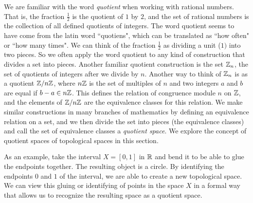\label{chap:quotients}


\vspace*{-17 pt}

\vspace*{13 pt}

\label{sec_quotients}

We are familiar with the word \emph{quotient} when working with rational numbers. That is, the fraction $\frac{1}{2}$ is the quotient of $1$ by $2$, and the set of rational numbers is the collection of all defined quotients of integers. The word quotient seems to have come from the latin word ``quotiens", which can be translated as ``how often" or ``how many times". We can think of the fraction $\frac{1}{2}$ as dividing a unit ($1)$ into two pieces. So we often apply the word quotient to any kind of construction that divides a set into pieces. Another familiar quotient construction is the set $\mathbb{Z}_n$, the set of quotients of integers after we divide by $n$. Another way to think of $\mathbb{Z}_n$ is as a quotient $\mathbb{Z}/n\mathbb{Z}$, where $n\mathbb{Z}$ is the set of multiples of $n$ and two integers $a$ and $b$ are equal if $b-a \in n\mathbb{Z}$. This defines the relation of congruence module $n$ on $\mathbb{Z}$, and the elements of $\mathbb{Z}/n\mathbb{Z}$ are the equivalence classes for this relation. We make similar constructions in many branches of mathematics by defining an equivalence relation on a set, and we then divide the set into pieces (the equivalence classes) and call the set of equivalence classes a \emph{quotient space}. We explore the concept of quotient spaces of topological spaces in this section.

As an example, take the interval $X = [0,1]$ in $\mathbb{R}$ and bend it to be able to glue the endpoints together. The resulting object is a circle. By identifying the endpoints $0$ and $1$ of the interval, we are able to create a new topological space. We can view this gluing or identifying of points in the space $X$ in a formal way that allows us to recognize the resulting space as a quotient space. 

\label{sec_quotient_top}

